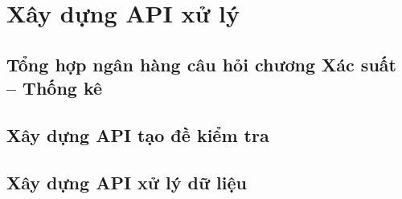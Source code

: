 \chapter{Xây dựng API xử lý}

\section{Tổng hợp ngân hàng câu hỏi chương Xác suất – Thống kê}

\section{Xây dựng API tạo đề kiểm tra}

\section{Xây dựng API xử lý dữ liệu}
